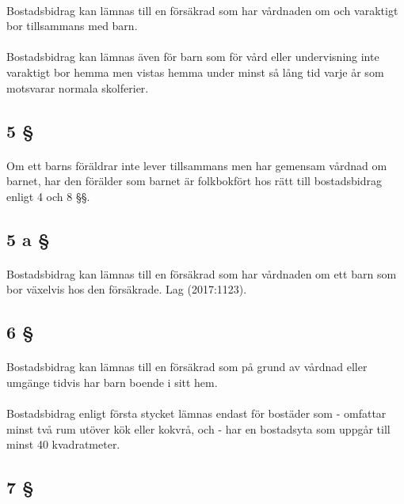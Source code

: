 \documentclass[a4paper,notitlepage,openany,10pt]{book}
\begin{document}
\paragraph*{}
Bostadsbidrag kan lämnas till en försäkrad som har vårdnaden om och varaktigt bor tillsammans med barn.
\paragraph*{}
Bostadsbidrag kan lämnas även för barn som för vård eller undervisning inte varaktigt bor hemma men vistas hemma under minst så lång tid varje år som motsvarar normala skolferier.
\subsection*{5 §}
\paragraph*{}
Om ett barns föräldrar inte lever tillsammans men har gemensam vårdnad om barnet, har den förälder som barnet är folkbokfört hos rätt till bostadsbidrag enligt 4 och 8 §§.
\subsection*{5 a §}
\paragraph*{}
Bostadsbidrag kan lämnas till en försäkrad som har vårdnaden om ett barn som bor växelvis hos den försäkrade.
Lag (2017:1123).
\subsection*{6 §}
\paragraph*{}
Bostadsbidrag kan lämnas till en försäkrad som på grund av vårdnad eller umgänge tidvis har barn boende i sitt hem.
\paragraph*{}
Bostadsbidrag enligt första stycket lämnas endast för bostäder som
\newline - omfattar minst två rum utöver kök eller kokvrå, och
\newline - har en bostadsyta som uppgår till minst 40 kvadratmeter.
\subsection*{7 §}
\end{document}
